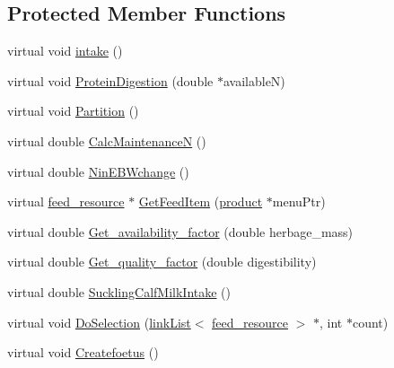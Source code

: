 \subsection*{Protected Member Functions}
\begin{DoxyCompactItemize}
\item 
virtual void \hyperlink{classcattle_a268ab4ca694f20f0207125ef11992933}{intake} ()
\item 
virtual void \hyperlink{classcattle_a88117c15ba8d100cc4489d7f8f125b76}{ProteinDigestion} (double $\ast$availableN)
\item 
virtual void \hyperlink{classcattle_af6ad25c3e883a183b1470d6b7e534406}{Partition} ()
\item 
virtual double \hyperlink{classcattle_a2a2b2e95eed78862af8cc6dda71c7d03}{CalcMaintenanceN} ()
\item 
virtual double \hyperlink{classcattle_adc0149dd773e4a12265c5e144eef6064}{NinEBWchange} ()
\item 
virtual \hyperlink{classfeed__resource}{feed\_\-resource} $\ast$ \hyperlink{classcattle_a30cf96265a9fbfec7859bd1e62730088}{GetFeedItem} (\hyperlink{classproduct}{product} $\ast$menuPtr)
\item 
virtual double \hyperlink{classcattle_aa66ca48a07bdaec8a2b280c47f6cc509}{Get\_\-availability\_\-factor} (double herbage\_\-mass)
\item 
virtual double \hyperlink{classcattle_a2ca11504c1a120f1b36f6bbf1572ae23}{Get\_\-quality\_\-factor} (double digestibility)
\item 
virtual double \hyperlink{classcattle_ad2dd5d5a563d9b421d4c3cf46e563df3}{SucklingCalfMilkIntake} ()
\item 
virtual void \hyperlink{classcattle_abefde6a746b3d6d1d699225494f93022}{DoSelection} (\hyperlink{classlink_list}{linkList}$<$ \hyperlink{classfeed__resource}{feed\_\-resource} $>$ $\ast$, int $\ast$count)
\item 
virtual void \hyperlink{classcattle_a42b73eb64c061427ced81f8524ea76a9}{Createfoetus} ()
\end{DoxyCompactItemize}
